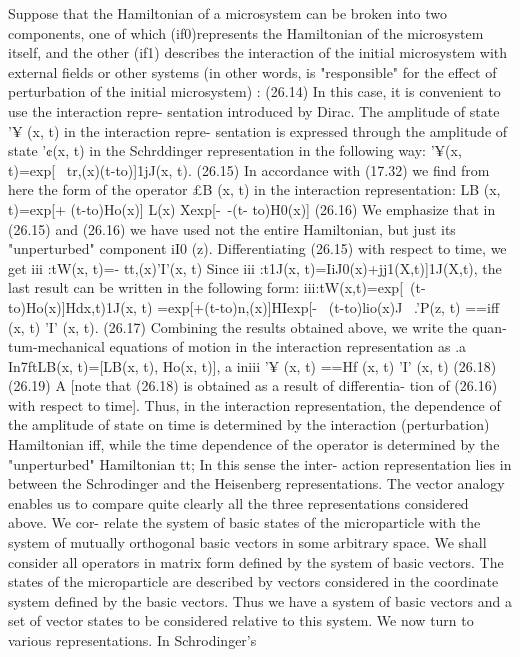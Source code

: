 \documentclass[a4paper,sfsidenotes,colorlinks=true]{tufte-book}
\numberwithin{equation}{section}
\numberwithin{figure}{section}
\begin{document}
{{{{{{Suppose that the Hamiltonian of a microsystem can be
broken into two components, one of which (if0)represents the Hamiltonian of the microsystem itself, and the other
(if1) describes the interaction of the initial microsystem with external fields or other systems (in other words, is "responsible" for the effect of perturbation of the initial microsystem) :
(26.14)
In this case, it is convenient to use the interaction repre- sentation introduced by Dirac. The amplitude of state '¥ (x, t) in the interaction repre- sentation is expressed through the amplitude of state '¢(x, t) in the Schrddinger representation in the following way:
'¥(x, t)=exp[~ tr,(x)(t-to)]1jJ(x, t).	(26.15) In accordance with (17.32) we find from here the form of
the operator £B (x, t) in the interaction representation:
LB (x, t)=exp[+ (t-to)Ho(x)] L(x)
Xexp[-~-(t- to)H0(x)]	(26.16)
We emphasize that in (26.15) and (26.16) we have used not the entire Hamiltonian, but just its "unperturbed"
component iI0 (z). Differentiating (26.15) with respect
to time, we get iii :tW(x, t)=- tt,(x)'I'(x, t)
Since iii :t1J(x, t)=IiJ0(x)+jj1(X,t)]1J(X,t), the last result can be written in the following form:
iii:tW(x,t)=exp[~(t-to)Ho(x)]Hdx,t)1J(x, t)
=exp[+(t-to)n,(x)]HIexp[- ~(t-to)lio(x)J
~.'P(z,	t) ==iff (x,	t) 'I' (x,	t).	(26.17)
Combining the results obtained above, we write the quan- tum-mechanical equations of motion in the interaction representation as
.a~~~ In7ftLB(x, t)=[LB(x, t), Ho(x, t)],
a iniii '¥ (x,	t) ==Hf (x,	t) 'I' (x,	t)
(26.18)
(26.19)
A
[note that (26.18) is obtained as a result of differentia- tion of (26.16) with respect to time]. Thus, in the interaction representation, the dependence of the amplitude of state on time is determined by the
interaction (perturbation) Hamiltonian iff, while the time dependence of the operator is determined by the
"unperturbed" Hamiltonian tt; In this sense the inter- action representation lies in between the Schrodinger and the Heisenberg representations.
The vector analogy enables us to compare quite clearly all the three representations considered above. We cor- relate the system of basic states of the microparticle with the system of mutually orthogonal basic vectors in some arbitrary space. We shall consider all operators in matrix form defined by the system of basic vectors. The states of the microparticle are described by vectors considered in the coordinate system defined by the basic vectors. Thus we have a system of basic vectors and a set of vector states to be considered relative to this system. We now turn to various representations. In Schrodinger's
}}}}}}
\end{document}
